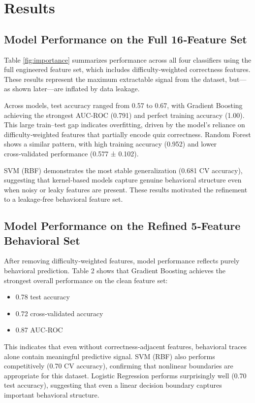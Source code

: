 \documentclass[conference]{IEEEtran}
\begin{document}
\section{Results}

\subsection{ Model Performance on the Full 16‑Feature Set}
Table \ref{fig:importance} summarizes performance across all four classifiers using the full engineered feature set, which includes difficulty‑weighted correctness features. These results represent the maximum extractable signal from the dataset, but—as shown later—are inflated by data leakage.

Across models, test accuracy ranged from 0.57 to 0.67, with Gradient Boosting achieving the strongest AUC‑ROC (0.791) and perfect training accuracy (1.00). This large train–test gap indicates overfitting, driven by the model’s reliance on difficulty‑weighted features that partially encode quiz correctness. Random Forest shows a similar pattern, with high training accuracy (0.952) and lower cross‑validated performance (0.577 ± 0.102).

SVM (RBF) demonstrates the most stable generalization (0.681 CV accuracy), suggesting that kernel‑based models capture genuine behavioral structure even when noisy or leaky features are present.
These results motivated the refinement to a leakage‑free behavioral feature set.

\subsection{ Model Performance on the Refined 5‑Feature Behavioral Set}

After removing difficulty‑weighted features, model performance reflects purely behavioral prediction. Table 2 shows that Gradient Boosting achieves the strongest overall performance on the clean feature set:
\begin{itemize}
    \item 0.78 test accuracy
    \item 0.72 cross‑validated accuracy
    \item 0.87 AUC‑ROC
\end{itemize}


This indicates that even without correctness‑adjacent features, behavioral traces alone contain meaningful predictive signal.
SVM (RBF) also performs competitively (0.70 CV accuracy), confirming that nonlinear boundaries are appropriate for this dataset. Logistic Regression performs surprisingly well (0.70 test accuracy), suggesting that even a linear decision boundary captures important behavioral structure.
\end{document}
